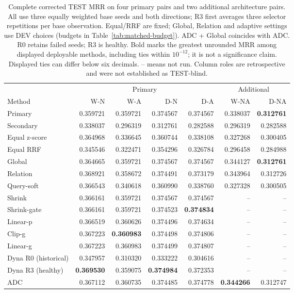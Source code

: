 \begin{table}[htbp]
\centering\footnotesize\setlength{\tabcolsep}{3pt}
\caption{Complete corrected TEST MRR on four primary pairs and two additional architecture pairs. All use three equally weighted base seeds and both directions; R3 first averages three selector repetitions per base observation. Equal/RRF are fixed; Global, Relation and adaptive settings use DEV choices (budgets in Table~\ref{tab:matched-budget}). ADC + Global coincides with ADC. R0 retains failed seeds; R3 is healthy. Bold marks the greatest unrounded MRR among displayed deployable methods, including ties within $10^{-12}$; it is not a significance claim. Displayed ties can differ below six decimals. -- means not run. Column roles are retrospective and were not established as TEST-blind.}
\label{tab:claims-main}
\begin{tabular}{lrrrr|rr}
\toprule
 & \multicolumn{4}{c|}{Primary} & \multicolumn{2}{c}{Additional}\\
Method & W-N & W-A & D-N & D-A & W-NA & D-NA\\
\midrule
Primary & 0.359721 & 0.359721 & 0.374567 & 0.374567 & 0.338037 & \textbf{0.312761}\\
Secondary & 0.338037 & 0.296319 & 0.312761 & 0.282588 & 0.296319 & 0.282588\\
Equal z-score & 0.364968 & 0.336645 & 0.360744 & 0.338108 & 0.327268 & 0.300405\\
Equal RRF & 0.345546 & 0.322471 & 0.354296 & 0.326784 & 0.296458 & 0.284988\\
Global & 0.364665 & 0.359721 & 0.374567 & 0.374567 & 0.344127 & \textbf{0.312761}\\
Relation & 0.368921 & 0.358672 & 0.374491 & 0.373179 & 0.343964 & 0.312726\\
\midrule
Query-soft & 0.366543 & 0.340618 & 0.360990 & 0.338760 & 0.327328 & 0.300505\\
Shrink & 0.366161 & 0.359721 & 0.374567 & 0.374567 & -- & --\\
Shrink-gate & 0.366161 & 0.359721 & 0.374523 & \textbf{0.374834} & -- & --\\
Linear-p & 0.366519 & 0.360626 & 0.374496 & 0.374634 & -- & --\\
Clip-g & 0.367223 & \textbf{0.360983} & 0.374498 & 0.374806 & -- & --\\
Linear-g & 0.367223 & 0.360983 & 0.374499 & 0.374807 & -- & --\\
\midrule
Dyna R0 (historical) & 0.347957 & 0.310320 & 0.333222 & 0.304616 & -- & --\\
Dyna R3 (healthy) & \textbf{0.369530} & 0.359075 & \textbf{0.374984} & 0.372353 & -- & --\\
\midrule
ADC & 0.367112 & 0.360735 & 0.374485 & 0.374778 & \textbf{0.344266} & 0.312747\\
\bottomrule
\end{tabular}
\end{table}
